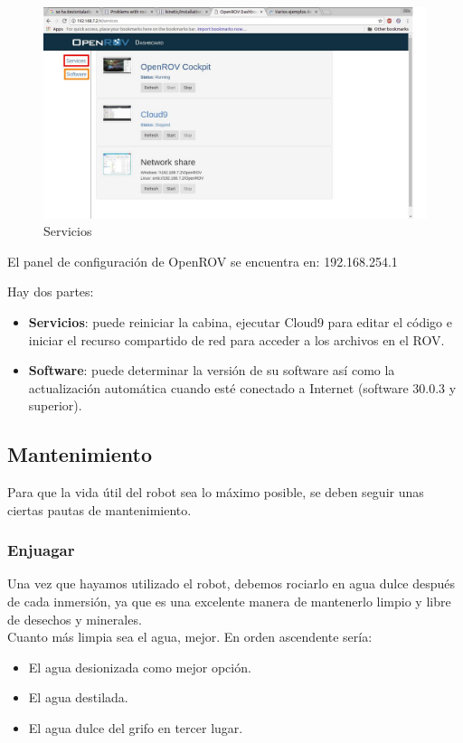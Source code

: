 \begin{figure} [hbtp]
\begin{center}
  \includegraphics[width=12cm]{img/cap3/3_5/services}
\end{center}
\caption{Servicios}
\label{fig:services}
\end{figure}

El panel de configuración de OpenROV se encuentra en: 192.168.254.1

Hay dos partes:
\begin{itemize}
\item[\textcolor{red}{\textbullet}]\textbf{Servicios}: puede reiniciar la cabina, ejecutar Cloud9 para editar el código e iniciar el recurso compartido de red para acceder a los archivos en el ROV.
\item[\textcolor{orange}{\textbullet}]\textbf{Software}: puede determinar la versión de su software así como la actualización automática cuando esté conectado a Internet (software 30.0.3 y superior).
\end{itemize}

\subsection{Mantenimiento}
\label{subsec:mantenimiento}

Para que la vida útil del robot sea lo máximo posible, se deben seguir unas ciertas pautas de mantenimiento.

\subsubsection{Enjuagar}
\label{subsubsec:enjuagar}
Una vez que hayamos utilizado el robot, debemos rociarlo en agua dulce después de cada inmersión, ya que es una excelente manera de mantenerlo limpio y libre de desechos y minerales.
\\Cuanto más limpia sea el agua, mejor. En orden ascendente sería:
\begin{itemize}
\item El agua desionizada como mejor opción.
\item El agua destilada.
\item El agua dulce del grifo en tercer lugar.
\end{itemize} 
  
